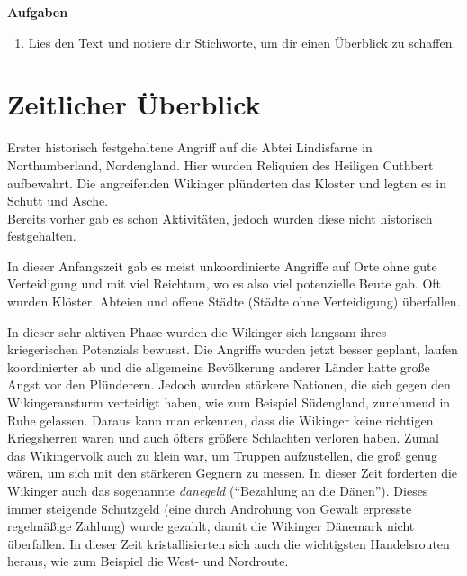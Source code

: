 \documentclass[12pt,a4paper,ngerman,openany]{book}
\newcommand{\aufgaben}[1]{
  \begin{tcolorbox}
    \textbf{Aufgaben}
    \begin{enumerate}
      #1
    \end{enumerate}
  \end{tcolorbox}
} %
\begin{document}
\aufgaben {
  \item Lies den Text und notiere dir Stichworte, um dir einen Überblick zu schaffen.
}

\pagebreak

\section{Zeitlicher Überblick}

\begin{tcolorbox}[sharp corners, title=08. Juni 793]
Erster historisch festgehaltene Angriff auf die Abtei Lindisfarne in Northumberland, Nordengland. Hier wurden Reliquien des Heiligen Cuthbert aufbewahrt. Die angreifenden Wikinger plünderten das Kloster und legten es in Schutt und Asche.\\
Bereits vorher gab es schon Aktivitäten, jedoch wurden diese nicht historisch festgehalten.
\end{tcolorbox}

\begin{tcolorbox}[sharp corners, title=Ungefähr 800 bis 850]
In dieser Anfangszeit gab es meist unkoordinierte Angriffe auf Orte ohne gute Verteidigung und mit viel Reichtum, wo es also viel potenzielle Beute gab. Oft wurden Klöster, Abteien und offene Städte (Städte ohne Verteidigung) überfallen.
\end{tcolorbox}

\begin{tcolorbox}[sharp corners, title=Ungefähr 850 bis 900]
In dieser sehr aktiven Phase wurden die Wikinger sich langsam ihres kriegerischen Potenzials bewusst. Die Angriffe wurden jetzt besser geplant, laufen koordinierter ab und die allgemeine Bevölkerung anderer Länder hatte große Angst vor den Plünderern.
Jedoch wurden stärkere Nationen, die sich gegen den Wikingeransturm verteidigt haben, wie zum Beispiel Südengland, zunehmend in Ruhe gelassen. Daraus kann man erkennen, dass die Wikinger keine richtigen Kriegsherren waren und auch öfters größere Schlachten verloren haben. Zumal das Wikingervolk auch zu klein war, um Truppen aufzustellen, die groß genug wären, um sich mit den stärkeren Gegnern zu messen.
In dieser Zeit forderten die Wikinger auch das sogenannte \textit{danegeld} (“Bezahlung an die Dänen”). Dieses immer steigende Schutzgeld (eine durch Androhung von Gewalt erpresste regelmäßige Zahlung) wurde gezahlt, damit die Wikinger Dänemark nicht überfallen.
In dieser Zeit kristallisierten sich auch die wichtigsten Handelsrouten heraus, wie zum Beispiel die West- und Nordroute.
\end{tcolorbox}
\end{document}
